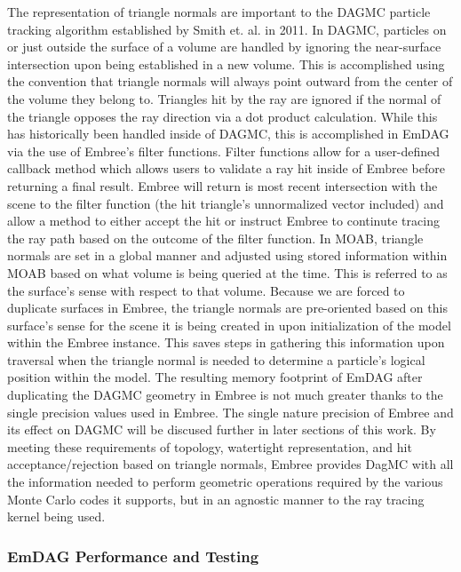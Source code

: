 \documentclass[12pt, a4paper]{article}
\begin{document}
The representation of triangle normals are important to the DAGMC particle tracking algorithm established by Smith et. al. \cite{Smith_2011} in 2011. In DAGMC, particles on or just outside the surface of a volume are handled by ignoring the near-surface intersection upon being established in a new volume. This is accomplished using the convention that triangle normals will always point outward from the center of the volume they belong to. Triangles hit by the ray are ignored if the normal of the triangle opposes the ray direction via a dot product calculation. While this has historically been handled inside of DAGMC, this is accomplished in EmDAG via the use of Embree's filter functions. Filter functions allow for a user-defined callback method which allows users to validate a ray hit inside of Embree before returning a final result. Embree will return is most recent intersection with the scene to the filter function (the hit triangle's unnormalized vector included) and allow a method to either accept the hit or instruct Embree to continute tracing the ray path based on the outcome of the filter function. In MOAB, triangle normals are set in a global manner and adjusted using stored information within MOAB based on what volume is being queried at the time. This is referred to as the surface's sense with respect to that volume. Because we are forced to duplicate surfaces in Embree, the triangle normals are pre-oriented based on this surface's sense for the scene it is being created in upon initialization of the model within the Embree instance. This saves steps in gathering this information upon traversal when the triangle normal is needed to determine a particle's logical position within the model. The resulting memory footprint of EmDAG after duplicating the DAGMC geometry in Embree is not much greater thanks to the single precision values used in Embree. The single nature precision of Embree and its effect on DAGMC will be discused further in later sections of this work.
By meeting these requirements of topology, watertight representation, and hit acceptance/rejection based on triangle normals, Embree provides DagMC with all the information needed to perform geometric operations required by the various Monte Carlo codes it supports, but in an agnostic manner to the ray tracing kernel being used.

\subsubsection{EmDAG Performance and Testing}%
\end{document}
